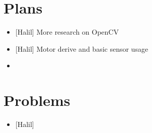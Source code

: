 \documentclass[a4paper,12pt]{article}
\begin{document}
\section{Plans}

\begin{itemize}
	
	\item {[Halil]} More research on OpenCV
	\item {[Halil]} Motor derive and basic sensor usage
	\item
	
\end{itemize}


\section{Problems}	

\begin{itemize}
	
	\item {[Halil]} 
	
\end{itemize}


\end{document}
